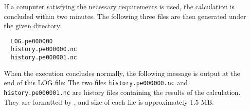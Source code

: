 If a computer satisfying the necessary requirements is used,
the calculation is concluded within two minutes.
The following three files are then generated under the given directory:
\begin{verbatim}
  LOG.pe000000
  history.pe000000.nc
  history.pe000001.nc
\end{verbatim}
When the execution concludes normally,
the following message is output at the end of this LOG file:
The two files \verb|history.pe000000.nc| and \verb|history.pe000001.nc| are history files containing the results of the calculation. They are formatted by \netcdf, and size of each file is approximately 1.5 MB.
